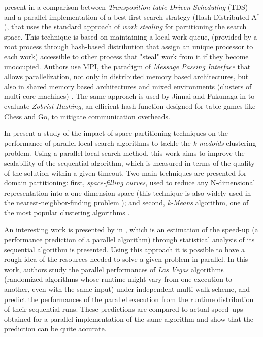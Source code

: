  present in \cite{Kishimoto2013} a comparison between \textit{Transposition-table Driven Scheduling} (TDS) and a parallel implementation of a best-first search strategy (Hash Distributed A$^*$), that uses the standard approach of \textit{work stealing} for partitioning the search space. This technique is based on maintaining a local work queue, (provided by a root process through hash-based distribution that assign an unique processor to each work) accessible to other process that "steal" work from it if they become unoccupied. Authors use MPI, the paradigm of \textit{Message Passing Interface} that allows parallelization, not only in distributed memory based architectures, but also in shared memory based architectures and mixed environments (clusters of multi-core machines) \cite{Grama2003a}. The same approach is used by Jinnai and Fukunaga in \cite{Jinnai} to evaluate \textit{Zobrist Hashing}, an efficient hash function designed for table games like Chess and Go, to mitigate communication overheads.

In \cite{Arbelaez2012}  present a study of the impact of space-partitioning techniques on the performance of parallel local search algorithms to tackle the \textit{k-medoids} clustering problem. Using a parallel local search method, this work aims to improve the scalability of the sequential algorithm, which is measured in terms of the quality of the solution within a given timeout. Two main techniques are presented for domain partitioning: first, {\it space-filling curves}, used to reduce any N-dimensional representation into a one-dimension space (this technique is also widely used in the nearest-neighbor-finding problem \cite{Chen2005}); and second, {\it k-Means} algorithm, one of the most popular clustering algorithms \cite{Berkhin2002}.

An interesting work is presented by  in \cite{Truchet02}, which is an estimation of the speed-up (a performance prediction of a parallel algorithm) through statistical analysis of its sequential algorithm is presented. Using this approach it is possible to have a rough idea of the resources needed to solve a given problem in parallel. In this work, authors study the parallel performances of \textit{Las Vegas} algorithms \cite{Babai1979} (randomized algorithms whose runtime might vary from one execution to another, even with the same input) under independent multi-walk scheme, and predict the performances of the parallel execution from the runtime distribution of their sequential runs. These predictions are compared to actual speed--ups obtained for a parallel implementation of the same algorithm and show that the prediction can be quite accurate.

